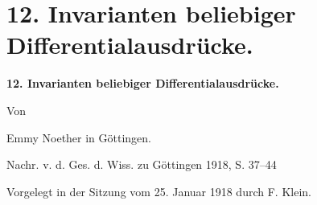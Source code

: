\section*{12. Invarianten beliebiger Differentialausdrücke.}
\begin{center}
{\Large\bfseries 12. Invarianten beliebiger Differentialausdrücke.}\par
\vspace{0.8em}
Von\par
\vspace{0.8em}
Emmy Noether in Göttingen.\par
\vspace{1.5em}
Nachr. v. d. Ges. d. Wiss. zu Göttingen 1918, S. 37--44
\end{center}

\vspace{3em}
\begin{center}
Vorgelegt in der Sitzung vom 25. Januar 1918 durch F. Klein.
\end{center}

